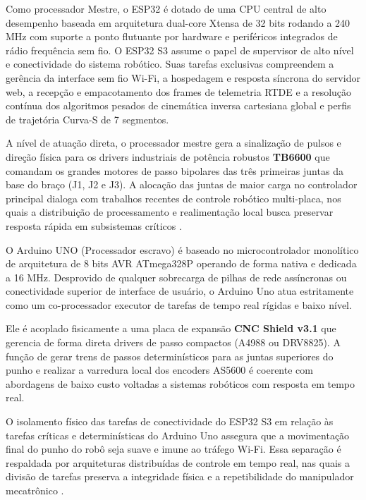 Como processador Mestre, o ESP32 é dotado de uma CPU central de alto desempenho baseada em arquitetura dual-core Xtensa de 32 bits rodando a 240 MHz com suporte a ponto flutuante por hardware e periféricos integrados de rádio frequência sem fio. O ESP32 S3 assume o papel de supervisor de alto nível e conectividade do sistema robótico. Suas tarefas exclusivas compreendem a gerência da interface sem fio Wi-Fi, a hospedagem e resposta síncrona do servidor web, a recepção e empacotamento dos frames de telemetria RTDE e a resolução contínua dos algoritmos pesados de cinemática inversa cartesiana global e perfis de trajetória Curva-S de 7 segmentos. 
    
A nível de atuação direta, o processador mestre gera a sinalização de pulsos e direção física para os drivers industriais de potência robustos \textbf{TB6600} que comandam os grandes motores de passo bipolares das três primeiras juntas da base do braço (J1, J2 e J3). A alocação das juntas de maior carga no controlador principal dialoga com trabalhos recentes de controle robótico multi-placa, nos quais a distribuição de processamento e realimentação local busca preservar resposta rápida em subsistemas críticos \cite{gomes2026micro}.
    
O Arduino UNO (Processador escravo) é baseado no microcontrolador monolítico de arquitetura de 8 bits AVR ATmega328P operando de forma nativa e dedicada a 16 MHz. Desprovido de qualquer sobrecarga de pilhas de rede assíncronas ou conectividade superior de interface de usuário, o Arduino Uno atua estritamente como um co-processador executor de tarefas de tempo real rígidas e baixo nível. 
    
Ele é acoplado fisicamente a uma placa de expansão \textbf{CNC Shield v3.1} que gerencia de forma direta drivers de passo compactos (A4988 ou DRV8825). A função de gerar trens de passos determinísticos para as juntas superiores do punho e realizar a varredura local dos encoders AS5600 é coerente com abordagens de baixo custo voltadas a sistemas robóticos com resposta em tempo real.

O isolamento físico das tarefas de conectividade do ESP32 S3 em relação às tarefas críticas e determinísticas do Arduino Uno assegura que a movimentação final do punho do robô seja suave e imune ao tráfego Wi-Fi. Essa separação é respaldada por arquiteturas distribuídas de controle em tempo real, nas quais a divisão de tarefas preserva a integridade física e a repetibilidade do manipulador mecatrônico \cite{jleilaty2023distributed}.

